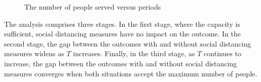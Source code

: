 \begin{figure}[h]
  \centering
  \caption{The number of people served versus periods}
  \label{Fig.lable}
\end{figure}


The analysis comprises three stages. In the first stage, where the capacity is sufficient, social distancing measures have no impact on the outcome. In the second stage, the gap between the outcomes with and without social distancing measures widens as $T$ increases. Finally, in the third stage, as $T$ continues to increase, the gap between the outcomes with and without social distancing measures converges when both situations accept the maximum number of people.


